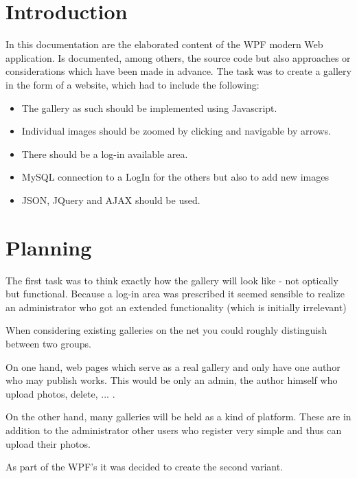 \documentclass[a4paper,12pt,oneside]{article} %
\begin{document}
 \newpage %
  
 

  

\newpage

\section{Introduction}

In this documentation are the elaborated content of the WPF modern
Web application. Is documented, among others, the source code but
also approaches or considerations which have been made in advance.
The task was to create a gallery in the form of a website, which had
to include the following:
\begin{itemize}
\item The gallery as such should be implemented using Javascript. 
\item Individual images should be zoomed by clicking and navigable by arrows. 
\item There should be a log-in available area. 
\item MySQL connection to a LogIn for the others but also to add new images 
\item JSON, JQuery and AJAX should be used.
\end{itemize}

\section{Planning}

The first task was to think exactly how the gallery will look like
- not optically but functional. Because a log-in area was prescribed
it seemed sensible to realize an administrator who got an extended
functionality (which is initially irrelevant) 

When considering existing galleries on the net you could roughly distinguish
between two groups. 

On one hand, web pages which serve as a real gallery and only have
one author who may publish works. This would be only an admin, the
author himself who upload photos, delete, ... .

On the other hand, many galleries will be held as a kind of platform.
These are in addition to the administrator other users who register
very simple and thus can upload their photos.

As part of the WPF's it was decided to create the second variant. 
\end{document}
